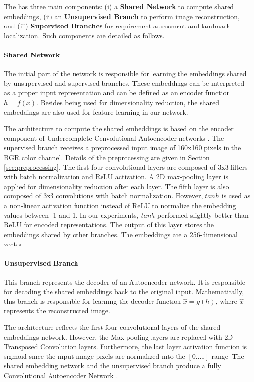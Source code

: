 The \methodname has three main components: (i) a \textbf{Shared Network} to compute shared embeddings, (ii) an \textbf{Unsupervised Branch} to perform image reconstruction, and (iii) \textbf{Supervised Branches} for requirement assessment and landmark localization. Such components are detailed as follows.
 
\paragraph{Shared Network}
 
The initial part of the network is responsible for learning the embeddings shared by unsupervised and supervised branches. These embeddings can be interpreted as a proper input representation and can be defined as an encoder function $h = f(x)$. Besides being used for dimensionality reduction, the shared embeddings are also used for feature learning in our network.
 
The architecture to compute the shared embeddings is based on the encoder component of Undercomplete Convolutional Autoencoder networks \citep[p.~500]{goodfellow2016deep}. The supervised branch receives a preprocessed input image of 160x160 pixels in the BGR color channel. Details of the preprocessing are given in Section \ref{sec:preprocessing}. The first four convolutional layers are composed of 3x3 filters with batch normalization and ReLU activation. A 2D max-pooling layer is applied for dimensionality reduction after each layer. The fifth layer is also composed of 3x3 convolutions with batch normalization. However, $tanh$ is used as a non-linear activation function instead of ReLU to normalize the embedding values between -1 and 1. In our experiments, $tanh$ performed slightly better than ReLU for encoded representations. The output of this layer stores the embeddings shared by other branches. The embeddings are a 256-dimensional vector.
 
\paragraph{Unsupervised Branch}
 
This branch represents the decoder of an Autoencoder network. It is responsible for decoding the shared embeddings back to the original input. Mathematically, this branch is responsible for learning the decoder function $\hat{x} = g(h)$, where $\hat{x}$ represents the reconstructed image. 
 
The architecture reflects the first four convolutional layers of the shared embeddings network. However, the Max-pooling layers are replaced with 2D Transposed Convolution layers. Furthermore, the last layer activation function is sigmoid since the input image pixels are normalized into the $[0...1]$ range. The shared embedding network and the unsupervised branch produce a fully Convolutional Autoencoder Network \citep{goodfellow2016deep}.
 
